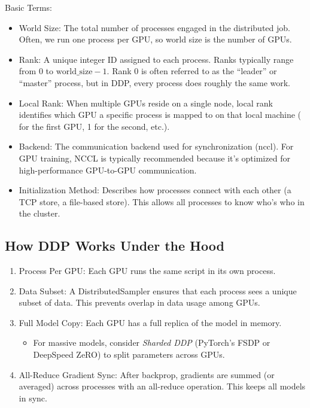 Basic Terms:
\begin{itemize}
	\item World Size: The total number of processes engaged in the distributed job. Often, we run one process per GPU, so world size is the number of GPUs.
	\item Rank: A unique integer ID assigned to each process. Ranks typically range from 0 to $\text{world\_size} - 1$. Rank 0 is often referred to as the ``leader'' or ``master'' process, but in DDP, every process does roughly the same work.
	\item Local Rank: When multiple GPUs reside on a single node, local rank identifies which GPU a specific process is mapped to on that local machine ( for the first GPU, 1 for the second, etc.).
	\item Backend: The communication backend used for synchronization (\eg nccl). For GPU training, NCCL is typically recommended because it's optimized for high-performance GPU-to-GPU communication.
	\item Initialization Method: Describes how processes connect with each other (\eg a TCP store, a file-based store). This allows all processes to know who's who in the cluster.
\end{itemize}

\subsection{How DDP Works Under the Hood}
\begin{enumerate}
	\item  Process Per GPU: Each GPU runs the same script in its own process.  
	\item  Data Subset: A DistributedSampler ensures that each process sees a unique subset of data. This prevents overlap in data usage among GPUs.  
	\item  Full Model Copy: Each GPU has a full replica of the model in memory.  
		\begin{itemize}
			\item For massive models, consider \textit{Sharded DDP} (\eg PyTorch's FSDP or DeepSpeed ZeRO) to split parameters across GPUs.
		\end{itemize}
	\item  All-Reduce Gradient Sync: After backprop, gradients are summed (or averaged) across processes with an all-reduce operation. This keeps all models in sync.
\end{enumerate}




